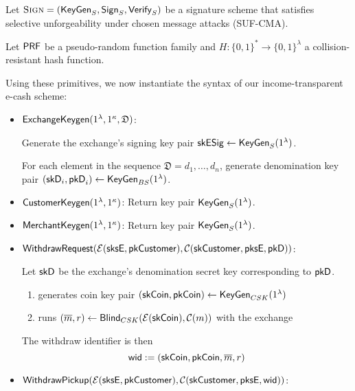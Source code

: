 Let $\textsc{Sign} = (\mathsf{KeyGen}_{S}, \mathsf{Sign}_{S}, \mathsf{Verify}_{S})$ be a signature
scheme that satisfies selective unforgeability under chosen message attacks (SUF-CMA).

Let $\mathsf{PRF}$ be a pseudo-random function family and $H : \{0,1\}^* \rightarrow \{0,1\}^\lambda$
a collision-resistant hash function.

Using these primitives, we now instantiate the syntax of our income-transparent e-cash scheme:

\begin{itemize}
  \item $\mathsf{ExchangeKeygen}(1^{\lambda}, 1^{\kappa}, \mathfrak{D})$:

    Generate the exchange's signing key pair $\mathsf{skESig} \leftarrow \mathsf{KeyGen}_{S}(1^\lambda)$.
    
    For each element in the sequence $\mathfrak{D} = d_1,\dots,d_n$, generate
    denomination key pair $(\mathsf{skD}_i, \mathsf{pkD}_i) \leftarrow \mathsf{KeyGen}_{BS}(1^\lambda)$.
  \item $\mathsf{CustomerKeygen}(1^\lambda,1^\kappa)$:
    Return key pair $\mathsf{KeyGen}_S(1^\lambda)$.
  \item $\mathsf{MerchantKeygen}(1^\lambda,1^\kappa)$:
    Return key pair $\mathsf{KeyGen}_S(1^\lambda)$.

  \item $\mathsf{WithdrawRequest}(\mathcal{E}(\mathsf{sksE}, \mathsf{pkCustomer}), \mathcal{C}(\mathsf{skCustomer}, \mathsf{pksE}, \mathsf{pkD}))$:

    Let $\mathsf{skD}$ be the exchange's denomination secret key corresponding to $\mathsf{pkD}$.

    \begin{enumerate}
      \item {} generates coin key pair $(\mathsf{skCoin}, \mathsf{pkCoin}) \leftarrow \mathsf{KeyGen}_{CSK}(1^\lambda)$
      \item {} runs $(\overline{m}, r) \leftarrow \mathsf{Blind}_{CSK}(\mathcal{E}(\mathsf{skCoin}), \mathcal{C}(m))$ with the exchange
    \end{enumerate}

    The withdraw identifier is then
    \begin{equation*}
      \mathsf{wid} := (\mathsf{skCoin}, \mathsf{pkCoin}, \overline{m}, r)
    \end{equation*}


  \item $\mathsf{WithdrawPickup}(\mathcal{E}(\mathsf{sksE}, \mathsf{pkCustomer}), \mathcal{C}(\mathsf{skCustomer}, \mathsf{pksE}, \mathsf{wid}))$:


\end{itemize}
